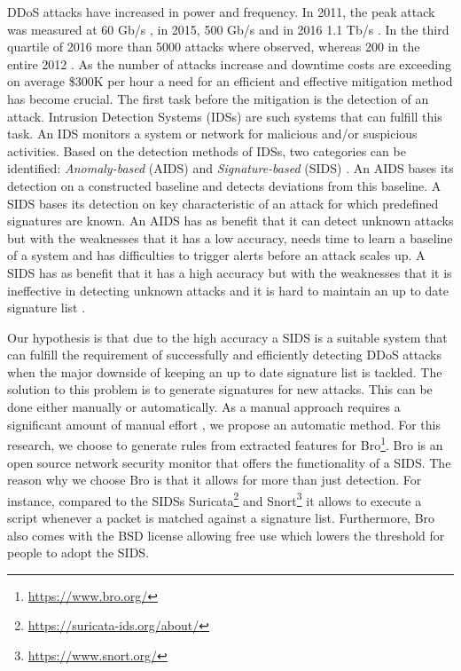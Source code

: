 DDoS attacks have increased in power and frequency. In 2011, the peak attack was measured at 60 Gb/s \cite{Arbor2014}, in 2015, 500 Gb/s and in 2016 1.1 Tb/s \cite{Akamai2017}. In the third quartile of 2016 more than 5000 attacks where observed, whereas 200 in the entire 2012 \cite{Akamai2016}. As the number of attacks increase and downtime costs are exceeding on average \$300K per hour \cite{ITIC2016} a need for an efficient and effective mitigation method has become crucial. The first task before the mitigation is the detection of an attack. Intrusion Detection Systems (IDSs) are such systems that can fulfill this task. An IDS monitors a system or network for malicious and/or suspicious activities. 
Based on the detection methods of IDSs, two categories can be identified: \textit{Anomaly-based} (AIDS) and \textit{Signature-based} (SIDS) \cite{fragkiadakis2015anomaly}. An AIDS bases its detection on a constructed baseline and detects deviations from this baseline. A SIDS bases its detection on key characteristic of an attack for which predefined signatures are known. An AIDS has as benefit that it can detect unknown attacks but with the weaknesses that it has a low accuracy, needs time to learn a baseline of a system and has difficulties to trigger alerts before an attack scales up. A SIDS has as benefit that it has a high accuracy but with the weaknesses that it is ineffective in detecting unknown attacks and it is hard to maintain an up to date signature list \cite{Liao2013}. 

Our hypothesis is that due to the high accuracy a SIDS is a suitable system that can fulfill the requirement of successfully and efficiently detecting DDoS attacks when the major downside of keeping an up to date signature list is tackled. The solution to this problem is to generate signatures for new attacks. This can be done either manually or automatically. As a manual approach requires a significant amount of manual effort \cite{Lin2013}, we propose an automatic method. For this research, we choose to generate rules from extracted features for Bro\footnote{\url{https://www.bro.org/}}. Bro is an open source network security monitor that offers the functionality of a SIDS. The reason why we choose Bro is that it allows for more than just detection. For instance, compared to the SIDSs Suricata\footnote{\url{https://suricata-ids.org/about/}} and Snort\footnote{\url{https://www.snort.org/}} it allows to execute a script whenever a packet is matched against a signature list. Furthermore, Bro also comes with the BSD license allowing free use which lowers the threshold for people to adopt the SIDS.


